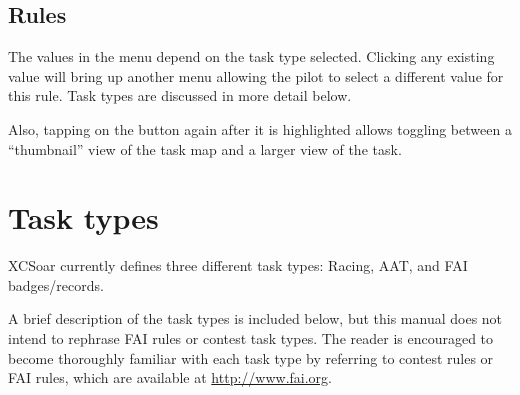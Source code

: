\subsection*{Rules}
The values in the menu depend on the task type selected. Clicking any existing 
 value will bring up another menu allowing the pilot to select a 
different value for this rule.  Task types are discussed in more detail below.

Also, tapping on the  button again after it is highlighted allows 
toggling between a ``thumbnail'' view of the task map and a larger view of the task.

\section{Task types}
XCSoar currently defines three different task types: Racing, AAT, and FAI badges/records.

A brief description of the task types is included below, but this manual does 
not intend to rephrase FAI rules or contest task types. The reader is encouraged 
to become thoroughly familiar with each task type by referring to contest rules 
or FAI rules, which are available at \url{http://www.fai.org}. 


